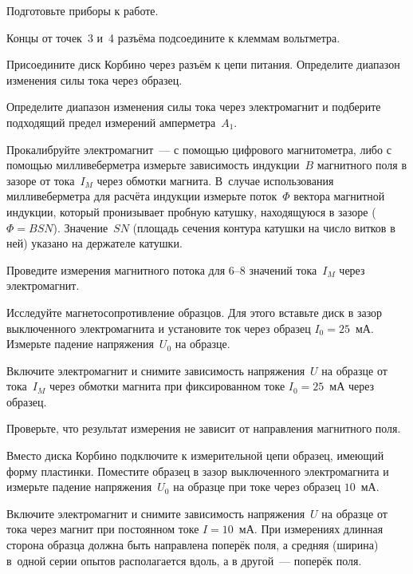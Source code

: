 \begin{lab:task}

\item{ Подготовьте приборы к работе.}

\item{ Концы от точек~3 и~4 разъёма подсоедините к клеммам вольтметра.}

\item{ Присоедините диск Корбино через разъём к цепи питания. Определите
диапазон изменения силы тока через образец.}

\item{ Определите диапазон изменения силы тока через электромагнит и подберите
подходящий предел измерений амперметра~$A_1$.}

\item{ Прокалибруйте электромагнит~--- с помощью цифрового магнитометра, либо с
помощью милливеберметра измерьте зависимость индукции~$B$ магнитного поля в
зазоре от тока~$I_M$ через обмотки магнита. В~случае использования
милливеберметра для расчёта индукции измерьте поток~$\Phi$ вектора магнитной
индукции, который пронизывает пробную катушку, находящуюся в зазоре
($\Phi=BSN$). Значение~$SN$ (площадь сечения контура катушки на число витков в
ней) указано на держателе катушки.}

\item{ Проведите измерения магнитного потока для 6--8 значений тока~$I_M$
через электромагнит.}

\item{ Исследуйте магнетосопротивление образцов. Для этого вставьте диск в зазор
выключенного электромагнита и установите ток через образец $I_0=25$~мА. Измерьте
падение напряжения~$U_0$ на образце.}

\item{ Включите электромагнит и снимите зависимость напряжения~$U$ на образце от
тока~$I_M$ через обмотки магнита при фиксированном токе $I_0=25$~мА через
образец.}

\item{ Проверьте, что результат измерения не зависит от направления магнитного
поля.}

\item{ Вместо диска Корбино подключите к измерительной цепи образец, имеющий
форму пластинки. Поместите образец в зазор выключенного электромагнита и
измерьте падение напряжения~$U_0$ на образце при токе через образец $10$~мА.}

\item{ Включите электромагнит и снимите зависимость напряжения~$U$ на образце от
тока через магнит при постоянном токе $I=10$~мА. При измерениях длинная сторона
образца должна быть направлена поперёк поля, а средняя (ширина) в~одной серии
опытов располагается вдоль, а в другой~--- поперёк поля.}


\end{lab:task}
